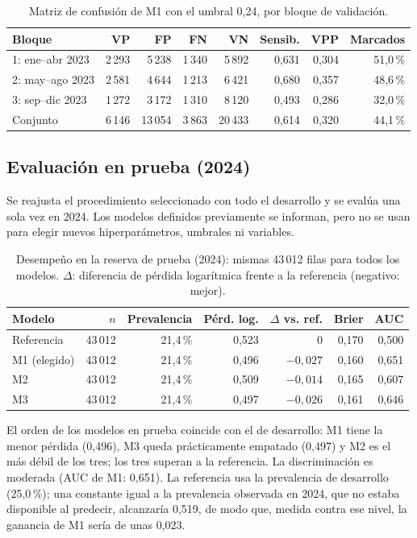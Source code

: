 \documentclass[11pt,a4paper]{article}
\begin{document}
\begin{table}[ht]
\centering
\caption{Matriz de confusión de M1 con el umbral 0,24, por bloque de validación.}
\label{tab:umbral}
\small
\begin{tabularx}{\textwidth}{@{}Xrrrrrrr@{}}
\toprule
Bloque & VP & FP & FN & VN & Sensib. & VPP & Marcados \\
\midrule
1: ene--abr 2023 & 2\,293 & 5\,238 & 1\,340 & 5\,892 & 0,631 & 0,304 & 51,0\,\% \\
2: may--ago 2023 & 2\,581 & 4\,644 & 1\,213 & 6\,421 & 0,680 & 0,357 & 48,6\,\% \\
3: sep--dic 2023 & 1\,272 & 3\,172 & 1\,310 & 8\,120 & 0,493 & 0,286 & 32,0\,\% \\
\midrule
Conjunto & 6\,146 & 13\,054 & 3\,863 & 20\,433 & 0,614 & 0,320 & 44,1\,\% \\
\bottomrule
\end{tabularx}
\end{table}
 
\subsection{Evaluación en prueba (2024)}
Se reajusta el procedimiento seleccionado con todo el desarrollo y se evalúa una sola vez en 2024. Los modelos definidos previamente se informan, pero no se usan para elegir nuevos hiperparámetros, umbrales ni variables.
 
\begin{table}[ht]
\centering
\caption{Desempeño en la reserva de prueba (2024): mismas 43\,012 filas para todos los modelos. $\Delta$: diferencia de pérdida logarítmica frente a la referencia (negativo: mejor).}
\label{tab:test}
\begin{tabularx}{\textwidth}{@{}Xrrrrrr@{}}
\toprule
Modelo & $n$ & Prevalencia & Pérd. log. & $\Delta$ vs. ref. & Brier & AUC \\
\midrule
Referencia & 43\,012 & 21,4\,\% & 0,523 & 0 & 0,170 & 0,500 \\
M1 (elegido) & 43\,012 & 21,4\,\% & 0,496 & $-0{,}027$ & 0,160 & 0,651 \\
M2 & 43\,012 & 21,4\,\% & 0,509 & $-0{,}014$ & 0,165 & 0,607 \\
M3 & 43\,012 & 21,4\,\% & 0,497 & $-0{,}026$ & 0,161 & 0,646 \\
\bottomrule
\end{tabularx}
\end{table}
 
El orden de los modelos en prueba coincide con el de desarrollo: M1 tiene la menor pérdida (0,496), M3 queda prácticamente empatado (0,497) y M2 es el más débil de los tres; los tres superan a la referencia. La discriminación es moderada (AUC de M1: 0,651). La referencia usa la prevalencia de desarrollo (25,0\,\%); una constante igual a la prevalencia observada en 2024, que no estaba disponible al predecir, alcanzaría 0,519, de modo que, medida contra ese nivel, la ganancia de M1 sería de unas 0,023.
 
\end{document}
